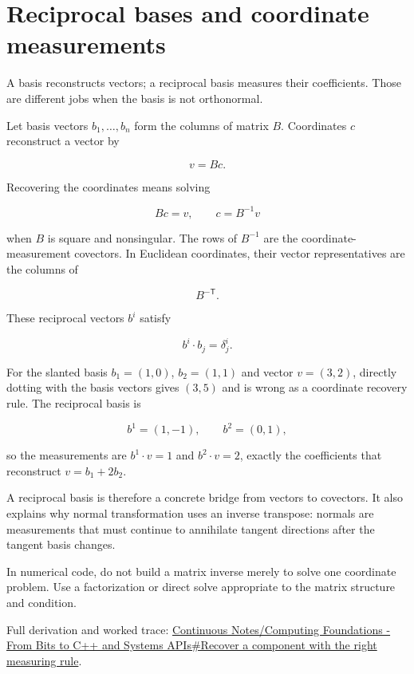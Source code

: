 \hypertarget{appendix-6b3d696dd902}{}\label{referencestart:appendix-6b3d696dd902}
\section{Reciprocal bases and coordinate measurements}\label{appendix-6b3d696dd902-reciprocal-bases-and-coordinate-measurements}

\hypertarget{appendix-6b3d696dd902-reciprocal-bases-and-coordinate-measurements}{}

A basis reconstructs vectors; a reciprocal basis measures their coefficients. Those are different jobs when the basis is not orthonormal.

Let basis vectors \(b_1,\ldots,b_n\) form the columns of matrix \(B\). Coordinates \(c\) reconstruct a vector by

\[
v=Bc.
\]

Recovering the coordinates means solving

\[
Bc=v,
\qquad c=B^{-1}v
\]

when \(B\) is square and nonsingular. The rows of \(B^{-1}\) are the coordinate-measurement covectors. In Euclidean coordinates, their vector representatives are the columns of

\[
B^{-\mathsf T}.
\]

These reciprocal vectors \(b^i\) satisfy

\[
b^i\cdot b_j=\delta^i_j.
\]

For the slanted basis \(b_1=(1,0)\), \(b_2=(1,1)\) and vector \(v=(3,2)\), directly dotting with the basis vectors gives \((3,5)\) and is wrong as a coordinate recovery rule. The reciprocal basis is

\[
b^1=(1,-1),\qquad b^2=(0,1),
\]

so the measurements are \(b^1\cdot v=1\) and \(b^2\cdot v=2\), exactly the coefficients that reconstruct \(v=b_1+2b_2\).

A reciprocal basis is therefore a concrete bridge from vectors to covectors. It also explains why normal transformation uses an inverse transpose: normals are measurements that must continue to annihilate tangent directions after the tangent basis changes.

In numerical code, do not build a matrix inverse merely to solve one coordinate problem. Use a factorization or direct solve appropriate to the matrix structure and condition.

Full derivation and worked trace: \hyperref[01-foundations-i-ch017-recover-a-component-with-the-right-measuring-rule]{Continuous Notes/Computing Foundations - From Bits to C++ and Systems APIs\#Recover a component with the right measuring rule}.

